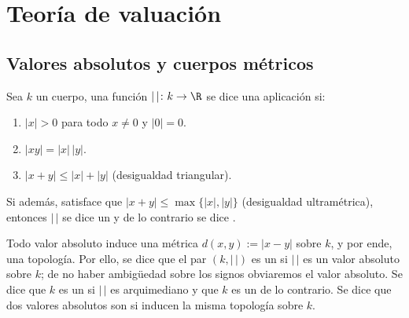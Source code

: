 \documentclass[teoria-numeros.tex]{subfiles}
\begin{document}
\chapter{Teoría de valuación}

\section{Valores absolutos y cuerpos métricos}
\begin{mydefi}
	Sea $k$ un cuerpo, una función $| \, |\colon k \to \R$ se dice una aplicación  si:
	\begin{enumerate}[{VA}1.]
		\item $|x| > 0$ para todo $x \ne 0$ y $|0| = 0$.
		\item $|xy| = |x| \, |y|$.
		\item $|x + y| \le |x| + |y|$ (desigualdad triangular).
	\end{enumerate}
	Si además, satisface que $|x + y| \le \max\{|x|, |y|\}$ (desigualdad ultramétrica),
	entonces $|\,|$ se dice un  y
	de lo contrario se dice .

	Todo valor absoluto induce una métrica $d(x, y) := |x - y|$ sobre $k$, y por ende, una topología.
	Por ello, se dice que el par $(k, |\,|)$ es un  si $|\,|$ es un valor absoluto sobre $k$;
	de no haber ambigüedad sobre los signos obviaremos el valor absoluto.
	Se dice que $k$ es un  si $|\,|$ es arquimediano
	y que $k$ es un  de lo contrario.
	Se dice que dos valores absolutos son  si inducen la misma topología sobre $k$.
\end{mydefi}
\end{document}
